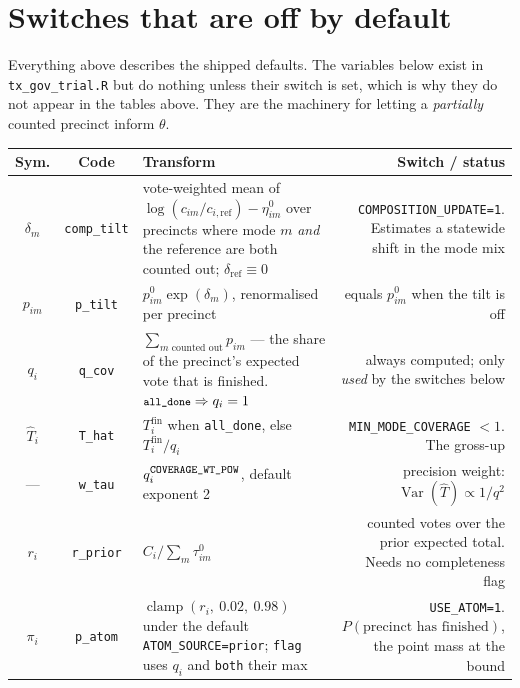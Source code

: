 \documentclass[11pt]{article}
\newcommand{\var}[1]{\texttt{\footnotesize #1}}
\newcommand{\file}[1]{\texttt{\footnotesize #1}}
\newcommand{\refm}{\mathrm{ref}}
\begin{document}
\section{Switches that are off by default}

Everything above describes the shipped defaults. The variables below exist in
\file{tx\_gov\_trial.R} but do nothing unless their switch is set, which is why they do
not appear in the tables above. They are the machinery for letting a \emph{partially}
counted precinct inform $\theta$.

\begin{center}\footnotesize
\begin{tabular}{@{}SCTR@{}}
\toprule
\textbf{Sym.} & \textbf{Code} & \textbf{Transform} & \textbf{Switch / status} \\
\midrule
$\delta_m$ & \var{comp\_tilt} &
  vote-weighted mean of $\log(c_{im}/c_{i,\refm}) - \eta^{0}_{im}$ over precincts where
  mode $m$ \emph{and} the reference are both counted out; $\delta_\refm \equiv 0$ &
  \var{COMPOSITION\_UPDATE=1}. Estimates a statewide shift in the mode mix \\[12pt]
$p_{im}$ & \var{p\_tilt} &
  $p^{0}_{im}\exp(\delta_m)$, renormalised per precinct &
  equals $p^{0}_{im}$ when the tilt is off \\[6pt]
$q_i$ & \var{q\_cov} &
  $\sum_{m \text{ counted out}} p_{im}$ --- the share of the precinct's expected vote
  that is finished. $\var{all\_done} \Rightarrow q_i = 1$ &
  always computed; only \emph{used} by the switches below \\[12pt]
$\widehat{T}_i$ & \var{T\_hat} &
  $T^{\text{fin}}_i$ when \var{all\_done}, else $T^{\text{fin}}_i / q_i$ &
  \var{MIN\_MODE\_COVERAGE} $< 1$. The gross-up \\[6pt]
--- & \var{w\_tau} & $q_i^{\var{COVERAGE\_WT\_POW}}$, default exponent 2 &
  precision weight: $\operatorname{Var}(\widehat{T}) \propto 1/q^2$ \\[10pt]
$r_i$ & \var{r\_prior} & $C_i \big/ \sum_m \tau^{0}_{im}$ &
  counted votes over the prior expected total. Needs no completeness flag \\[10pt]
$\pi_i$ & \var{p\_atom} &
  $\operatorname{clamp}(r_i,\ 0.02,\ 0.98)$ under the default
  \var{ATOM\_SOURCE=prior}; \var{flag} uses $q_i$ and \var{both} their max &
  \var{USE\_ATOM=1}. $P(\text{precinct has finished})$, the point mass at the bound \\
\bottomrule
\end{tabular}
\end{center}
\end{document}
